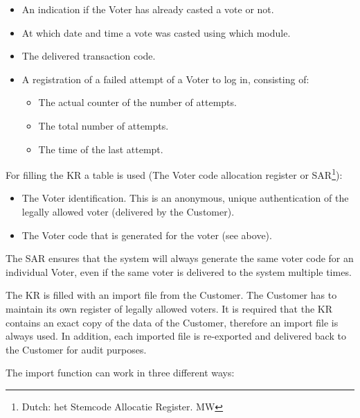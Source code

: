 \begin{itemize}
	\item An indication if the Voter has already casted a vote or not.

	\item At which date and time a vote was casted using which module.

	\item The delivered transaction code.

	\item A registration of a failed attempt of a Voter to log in,
	consisting of:

	\begin{itemize}
		\item The actual counter of the number of attempts.
		\item The total number of attempts.
		\item The time of the last attempt. 
	\end{itemize}

\end{itemize}

For filling the KR a table is used (The Voter code allocation register
or SAR\footnote{Dutch: het Stemcode Allocatie Register. MW}):

\begin{itemize}
	\item The Voter identification. This is an anonymous, unique
	authentication of the legally allowed voter (delivered by the
	Customer).

	\item The Voter code that is generated for the voter (see above).

\end{itemize}

The SAR ensures that the system will always generate the same voter
code for an individual Voter, even if the same voter is delivered to the
system multiple times.

The KR is filled with an import file from the Customer. The Customer has
to maintain its own register of legally allowed voters. It is required
that the KR contains an exact copy of the data of the Customer,
therefore an import file is always used. In addition, each imported
file is re-exported and delivered back to the Customer for audit
purposes.

The import function can work in three different ways:

